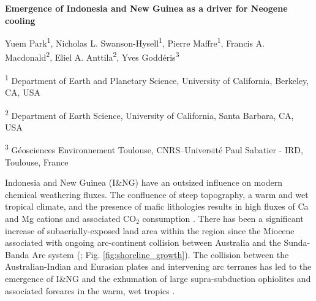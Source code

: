 \documentclass[11pt,letterpaper]{article}
\newcommand{\COtwo}{CO$_{2}$\xspace}
\begin{document}
\begin{flushleft}
{\Large \textbf{Emergence of Indonesia and New Guinea as a driver for Neogene cooling}}

Yuem Park\textsuperscript{1},
Nicholas L. Swanson-Hysell\textsuperscript{1},
Pierre Maffre\textsuperscript{1},
Francis A. Macdonald\textsuperscript{2},
Eliel A. Anttila\textsuperscript{2},
Yves Godd\'eris\textsuperscript{3}

\bigskip
\textsuperscript{1} Department of Earth and Planetary Science, University of California, Berkeley, CA, USA

\textsuperscript{2} Department of Earth Science, University of California, Santa Barbara, CA, USA

\textsuperscript{3} G\'eosciences Environnement Toulouse, CNRS--Universit\'e Paul Sabatier - IRD, Toulouse, France

\bigskip

\end{flushleft}

\linenumbers

Indonesia and New Guinea (I\&NG) have an outsized influence on modern chemical weathering fluxes. The confluence of steep topography, a warm and wet tropical climate, and the presence of mafic lithologies results in high fluxes of Ca and Mg cations and associated \COtwo consumption \citep{Gaillardet1999a, Hartmann2009a, Hartmann2014a}. There has been a significant increase of subaerially-exposed land area within the region since the Miocene associated with ongoing arc-continent collision between Australia and the Sunda-Banda Arc system (\citealp{Molnar2015a, Hall2017a}; Fig. \ref{fig:shoreline_growth}). The collision between the Australian-Indian and Eurasian plates and intervening arc terranes has led to the emergence of I\&NG and the exhumation of large supra-subduction ophiolites and associated forearcs in the warm, wet tropics \citep{Macdonald2019a}.
\end{document}
